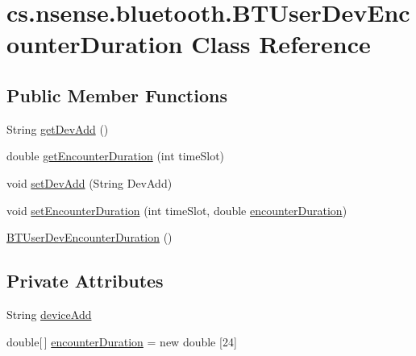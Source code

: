 \hypertarget{classcs_1_1nsense_1_1bluetooth_1_1_b_t_user_dev_encounter_duration}{\section{cs.\-nsense.\-bluetooth.\-B\-T\-User\-Dev\-Encounter\-Duration Class Reference}
\label{classcs_1_1nsense_1_1bluetooth_1_1_b_t_user_dev_encounter_duration}
}
\subsection*{Public Member Functions}
\begin{DoxyCompactItemize}
\item 
String \hyperlink{classcs_1_1nsense_1_1bluetooth_1_1_b_t_user_dev_encounter_duration_aeb3bddd7a906efb7b648da88a53f120c}{get\-Dev\-Add} ()
\item 
double \hyperlink{classcs_1_1nsense_1_1bluetooth_1_1_b_t_user_dev_encounter_duration_abf9db76b2ca9719c9031cb7ff397454c}{get\-Encounter\-Duration} (int time\-Slot)
\item 
void \hyperlink{classcs_1_1nsense_1_1bluetooth_1_1_b_t_user_dev_encounter_duration_ade721717d3630af8a754f4d3ce0fc016}{set\-Dev\-Add} (String Dev\-Add)
\item 
void \hyperlink{classcs_1_1nsense_1_1bluetooth_1_1_b_t_user_dev_encounter_duration_a8bebbb13eb0bc112ebe8301c7b6f7043}{set\-Encounter\-Duration} (int time\-Slot, double \hyperlink{classcs_1_1nsense_1_1bluetooth_1_1_b_t_user_dev_encounter_duration_afeeaee6dc7ba949e1a8c40cbd71fea2e}{encounter\-Duration})
\item 
\hyperlink{classcs_1_1nsense_1_1bluetooth_1_1_b_t_user_dev_encounter_duration_a5ad5caf36ac8080583735cd9fd9b88c7}{B\-T\-User\-Dev\-Encounter\-Duration} ()
\end{DoxyCompactItemize}
\subsection*{Private Attributes}
\begin{DoxyCompactItemize}
\item 
String \hyperlink{classcs_1_1nsense_1_1bluetooth_1_1_b_t_user_dev_encounter_duration_a72779f18fd8148cf5bcfe3bb9d8ed17a}{device\-Add}
\item 
double\mbox{[}$\,$\mbox{]} \hyperlink{classcs_1_1nsense_1_1bluetooth_1_1_b_t_user_dev_encounter_duration_afeeaee6dc7ba949e1a8c40cbd71fea2e}{encounter\-Duration} = new double \mbox{[}24\mbox{]}
\end{DoxyCompactItemize}


